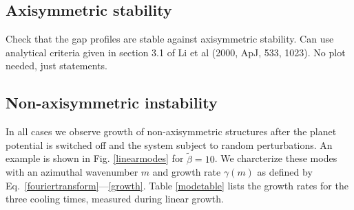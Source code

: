 {\bf
\subsection{Axisymmetric stability}
Check that the gap profiles are stable against axisymmetric
stability. Can use analytical criteria given in section 3.1 of Li et
al (2000, ApJ, 533, 1023). No plot needed, just statements. 
}

\subsection{Non-axisymmetric instability}\label{linear}


In all cases we observe growth of non-axisymmetric structures after the
planet potential is switched off and the system subject to random
perturbations. An example is shown in Fig. \ref{linearmodes} for 
$\tilde{\beta}=10$. We charcterize these
modes with an azimuthal wavenumber $m$ and growth rate $\gamma(m)$ as defined by
Eq.~\ref{fouriertransform}---\ref{growth}. Table \ref{modetable}
lists the growth rates for the three cooling
times, measured during linear growth. 


